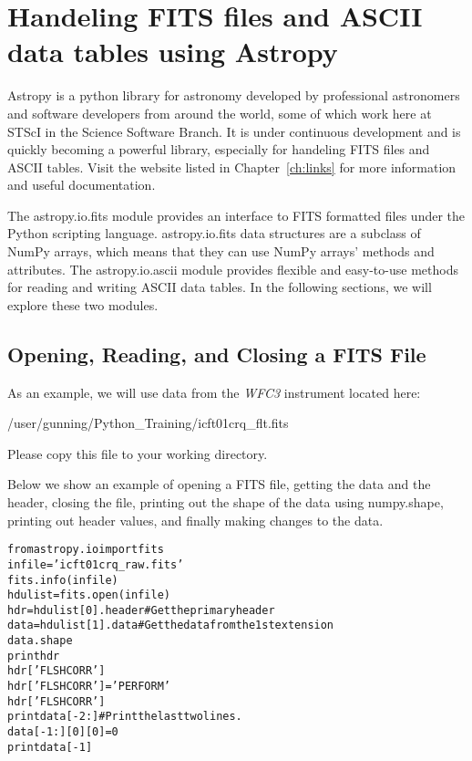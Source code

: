 \chapter{Handeling FITS files and ASCII data tables using Astropy}
\label{ch:fits}
Astropy is a python library for astronomy developed by professional astronomers
and software developers from around the world, some of which work here at STScI
in the Science Software Branch.  It is under continuous development and is quickly
becoming a powerful library, especially for handeling FITS files and ASCII tables.
Visit the website listed in Chapter~\ref{ch:links} for more information and useful
documentation.

The {\sf \small astropy.io.fits} module provides an interface to FITS formatted files under the 
Python scripting language.  {\sf \small astropy.io.fits} data structures are a subclass of NumPy 
arrays, which means that they can use NumPy arrays' methods and attributes.  The
{\sf \small astropy.io.ascii} module provides flexible and easy-to-use methods for reading and 
writing ASCII data tables.  In the following sections, we will explore these two modules.
 
\section{Opening, Reading, and Closing a FITS File}
As an example, we will use data from the \emph{WFC3} instrument located here:

/user/gunning/Python\_Training/icft01crq\_flt.fits

Please copy this file to your working directory. 

Below we show an example of opening a FITS file, getting
the data and the header, closing the file, printing out the shape of
the data using {\sf \small numpy.shape}, printing out header values,
and finally making changes to the data.

\begin{alltt}
\pytab from astropy.io import fits
\pytab infile = 'icft01crq_raw.fits'
\pytab fits.info(infile)
\pytab hdulist = fits.open(infile)
\pytab hdr = hdulist[0].header  # Get the primary header
\pytab data = hdulist[1].data  # Get the data from the 1st extension 
\pytab data.shape
\pytab print hdr 
\pytab hdr['FLSHCORR'] 
\pytab hdr['FLSHCORR'] = 'PERFORM'
\pytab hdr['FLSHCORR']
\pytab print data[-2:]  # Print the last two lines.
\pytab data[-1:][0][0] = 0
\pytab print data[-1]
\end{alltt}

